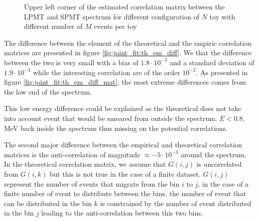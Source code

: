 \documentclass[../main.tex]{subfiles}
\begin{document}
\begin{figure}[ht]
\begin{subfigure}[t]{0.33\linewidth}
    \caption{}
    \label{fig:joint_fit:empirical_cor:cheff_kiss}
  \end{subfigure}
  \caption{Upper left corner of the estimated correlation matrix between the LPMT and SPMT spectrum for different configuration of $N$ toy with different number of $M$ events per toy}
  \label{fig:joint_fit:empirical_cor}
\end{figure}


The difference between the element of the theoretical and the empiric correlation matrices are presented in figure \ref{fig:joint_fit:th_em_diff}. We that the difference between the two is very small with a bias of $1.8 \cdot 10^{-3}$ and a standard deviation of $1.9 \cdot 10^{-3}$ while the interesting correlation are of the order $10^{-2}$. As presented in figure \ref{fig:joint_fit:th_em_diff_mat}, the most extreme differences comes from the low end of the spectrum.

This low energy difference could be explained as the theoretical does not take into account event that would be smeared from outside the spectrum. $E < 0.8$, MeV back inside the spectrum thus missing on the potential correlations.

The second major difference between the empirical and theoretical correlation matrices is the anti-correlation of magnitude $\approx -5\cdot 10^{-3}$ around the spectrum. In the theoretical correlation matrix, we assume that $G(i, j)$ is uncorrelated from $G(i, k)$ but this is not true in the case of a finite dataset. $G(i, j)$ represent the number of events that migrate from the bin $i$ to $j$, in the case of a finite number of event to distribute between the bins, the number of event that can be distributed in the bin $k$ is constrained by the number of event distributed in the bin $j$ leading to the anti-correlation between this two bins.
\end{document}
